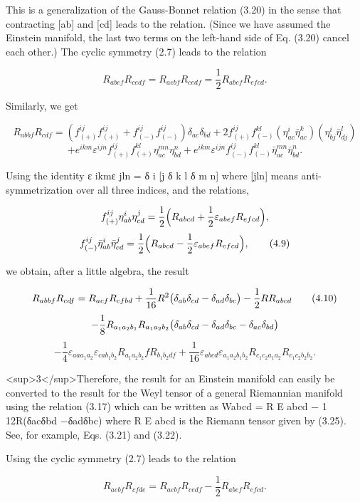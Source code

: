 \documentclass{article}
\begin{document}
This is a generalization of the Gauss-Bonnet relation (3.20) in the sense that contracting [ab] and [cd] leads to the relation. (Since we have assumed the Einstein manifold, the last two terms on the left-hand side of Eq. (3.20) cancel each other.) The cyclic symmetry (2.7) leads to the relation

$$R_{abef}R_{cedf}=R_{aebf}R_{cedf}=\frac{1}{2}R_{abef}R_{efcd}.\tag{4.7}$$

Similarly, we get

$$R_{abbf}R_{cdf}=\left(f^{ij}_{(+)}f^{ij}_{(+)}+f^{ij}_{(-)}f^{ij}_{(-)}\right)\delta_{ac}\delta_{bd}+2f^{ij}_{(+)}f^{kl}_{(-)}(\eta^{i}_{ac}\bar{\eta}^{k}_{ac})\left(\eta^{i}_{bj}\bar{\eta}^{l}_{dj}\right)\tag{4.8}$$ $$+e^{ikm}\varepsilon^{ijn}f^{ij}_{(+)}f^{kl}_{(+)}\eta^{mn}_{ac}\eta^{n}_{bd}+e^{ikm}\varepsilon^{ijn}f^{ij}_{(-)}f^{kl}_{(-)}\bar{\eta}^{mn}_{ac}\bar{\eta}^{n}_{bd}.$$

Using the identity ε ikmε jln = δ i [j δ k l δ m n] where [jln] means anti-symmetrization over all three indices, and the relations,

$$f^{ij}_{(+)}\eta^{i}_{ab}\eta^{j}_{cd}=\frac{1}{2}\Big{(}R_{abcd}+\frac{1}{2}\varepsilon_{abef}R_{efcd}\Big{)},$$ $$f^{ij}_{(-)}\bar{\eta}^{i}_{ab}\bar{\eta}^{j}_{cd}=\frac{1}{2}\Big{(}R_{abcd}-\frac{1}{2}\varepsilon_{abef}R_{efcd}\Big{)},\tag{4.9}$$

we obtain, after a little algebra, the result

$$R_{abbf}R_{cdf}=R_{acf}R_{cfbd}+\frac{1}{16}R^{2}\big{(}\delta_{ab}\delta_{cd}-\delta_{ad}\delta_{bc}\big{)}-\frac{1}{2}RR_{abcd}\tag{4.10}$$ $$-\frac{1}{8}R_{a_{1}a_{2}b_{1}}R_{a_{1}a_{2}b_{2}}\big{(}\delta_{ab}\delta_{cd}-\delta_{ad}\delta_{bc}-\delta_{ac}\delta_{bd}\big{)}$$ $$-\frac{1}{4}\varepsilon_{aaa_{1}a_{2}}\varepsilon_{cab_{1}b_{2}}R_{a_{1}a_{2}b_{2}}fR_{b_{1}b_{2}df}+\frac{1}{16}\varepsilon_{abcd}\varepsilon_{a_{1}a_{2}b_{1}b_{2}}R_{c_{1}c_{2}a_{1}a_{2}}R_{c_{1}c_{2}b_{2}b_{2}}.$$

<sup>3</sup>Therefore, the result for an Einstein manifold can easily be converted to the result for the Weyl tensor of a general Riemannian manifold using the relation (3.17) which can be written as Wabcd = R E abcd − 1 12R(δacδbd −δadδbc) where R E abcd is the Riemann tensor given by (3.25). See, for example, Eqs. (3.21) and (3.22).

Using the cyclic symmetry (2.7) leads to the relation

$$R_{a e b f}R_{c f d e}=R_{a e b f}R_{c e d f}-\frac{1}{2}R_{a b e f}R_{e f c d}.\tag{4.11}$$
\end{document}

